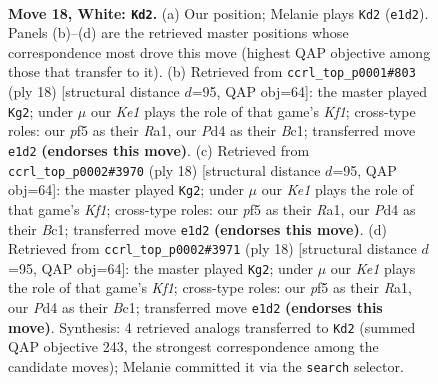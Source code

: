 \documentclass[11pt]{article}
\begin{document}
\clearpage

\begin{figure}[p]\centering
\begin{subfigure}{0.46\textwidth}\centering
\resizebox{\linewidth}{!}{%
\newchessgame
\chessboard[
  setfen={rnbqr1k1/2pn2pp/1p2p3/p2pPp2/3P1P1P/6Q1/PPP1N1P1/1R2KBNR w - - 0 18},
  showmover=false,
  pgfstyle=straightmove, color=movearrow, markmove={e1-d2}
]}
\caption{}
\end{subfigure}\hfill
\begin{subfigure}{0.46\textwidth}\centering
\resizebox{\linewidth}{!}{%
\newchessgame
\chessboard[
  setfen={rn1qk2r/4ppbp/3p1np1/2pP4/4P3/2N3P1/PP3P1P/R1BQ1KNR w kq - 1 10},
  showmover=false,
  pgfstyle=straightmove, color=movearrow, markmove={f1-g2}
]}
\caption{}
\end{subfigure}
\\[4pt]
\begin{subfigure}{0.46\textwidth}\centering
\resizebox{\linewidth}{!}{%
\newchessgame
\chessboard[
  setfen={rn1qk2r/4ppbp/3p1np1/2pP4/4P3/2N3P1/PP3P1P/R1BQ1KNR w kq - 1 10},
  showmover=false,
  pgfstyle=straightmove, color=movearrow, markmove={f1-g2}
]}
\caption{}
\end{subfigure}\hfill
\begin{subfigure}{0.46\textwidth}\centering
\resizebox{\linewidth}{!}{%
\newchessgame
\chessboard[
  setfen={rn1qk2r/4ppbp/3p1np1/2pP4/4P3/2N3P1/PP3P1P/R1BQ1KNR w kq - 1 10},
  showmover=false,
  pgfstyle=straightmove, color=movearrow, markmove={f1-g2}
]}
\caption{}
\end{subfigure}
\caption{\textbf{Move 18, White: \texttt{Kd2}.} (a) Our position; Melanie plays \texttt{Kd2} (\texttt{e1d2}). Panels (b)--(d) are the retrieved master positions whose correspondence most drove this move (highest QAP objective among those that transfer to it). (b) Retrieved from \texttt{ccrl\_top\_p0001\#803} (ply 18) [structural distance $d$=95, QAP obj=64]: the master played \texttt{Kg2}; under $\mu$ our \emph{Ke1} plays the role of that game's \emph{Kf1}; cross-type roles: our \emph{p}f5 as their \emph{R}a1, our \emph{P}d4 as their \emph{B}c1; transferred move \texttt{e1d2} \textbf{(endorses this move)}. (c) Retrieved from \texttt{ccrl\_top\_p0002\#3970} (ply 18) [structural distance $d$=95, QAP obj=64]: the master played \texttt{Kg2}; under $\mu$ our \emph{Ke1} plays the role of that game's \emph{Kf1}; cross-type roles: our \emph{p}f5 as their \emph{R}a1, our \emph{P}d4 as their \emph{B}c1; transferred move \texttt{e1d2} \textbf{(endorses this move)}. (d) Retrieved from \texttt{ccrl\_top\_p0002\#3971} (ply 18) [structural distance $d$=95, QAP obj=64]: the master played \texttt{Kg2}; under $\mu$ our \emph{Ke1} plays the role of that game's \emph{Kf1}; cross-type roles: our \emph{p}f5 as their \emph{R}a1, our \emph{P}d4 as their \emph{B}c1; transferred move \texttt{e1d2} \textbf{(endorses this move)}. Synthesis: 4 retrieved analogs transferred to \texttt{Kd2} (summed QAP objective 243, the strongest correspondence among the candidate moves); Melanie committed it via the \texttt{search} selector.}
\label{fig:thought-m34}
\end{figure}
\end{document}
